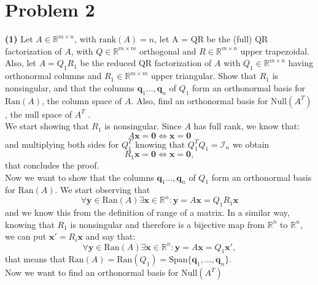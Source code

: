 \documentclass[a4paper,11pt]{article}
\newcommand{\R}{\mathbb{R}}
\begin{document}
\section*{Problem 2}
\textbf{(1)} Let $A \in \R^{m\times n}$, with $\text{rank}(A) = n$, let {A = QR} be the (full) QR factorization of $A$, with $Q \in \R^{m\times m} $ orthogonal and $R \in \R^{m\times n}$ upper trapezoidal. Also, let $A = Q_1 R_1$ be the reduced QR factorization of $A$ with $Q_1 \in \R^{m\times n}$ having orthonormal columns and $R_1 \in \R^{m\times m}$ upper triangular. Show that $R_1$ is nonsingular, and that the columns $\textbf{q}_1 . . . , \textbf{q}_n$ of $Q_1$ form an orthonormal basis for $\text{Ran}(A)$, the column space of $A$. Also, find an orthonormal basis for $\text{Null}(A^T)$, the null space of $A^T$ .\\
We start showing that $R_1$ is nonsingular. Since $A$ has full rank, we know that:
\begin{equation}\label{key}
	A \textbf{x} = \textbf{0} \Leftrightarrow \textbf{x} = \textbf{0}
\end{equation}
and multiplying both sides for $Q_1^T$ knowing that $Q_1^T Q_1 = \mathcal{I}_n$ we obtain
\begin{equation}\label{key}
	R_1 \textbf{x} = \textbf{0} \Leftrightarrow \textbf{x} = \textbf{0},
\end{equation}
that concludes the proof.\\
Now we want to show that the columns $\textbf{q}_1 . . . , \textbf{q}_n$ of $Q_1$ form an orthonormal basis for $\text{Ran}(A)$. We start observing that 
\begin{equation}\label{key}
	\forall \textbf{y} \in \text{Ran}(A) \exists \textbf{x} \in \R^n : \textbf{y} = A \textbf{x} = Q_1R_1\textbf{x}
\end{equation}
and we know this from the definition of range of a matrix. In a similar way, knowing that $R_1$ is nonsingular and therefore is a bijective map from $\R^n$ to $\R^n$, we can put $\textbf{x}' = R_i \textbf{x}$ and say that:
\begin{equation}\label{key}
	\forall \textbf{y} \in \text{Ran}(A) \exists \textbf{x} \in \R^n : \textbf{y} = A \textbf{x} = Q_1\textbf{x}',
\end{equation}
that means that $\text{Ran}(A) = \text{Ran}(Q_1) = \text{Span}\{\textbf{q}_1,\dots,\textbf{q}_n\}$.\\
Now we want to find an orthonormal basis for $\text{Null}(A^T)$
\end{document}
